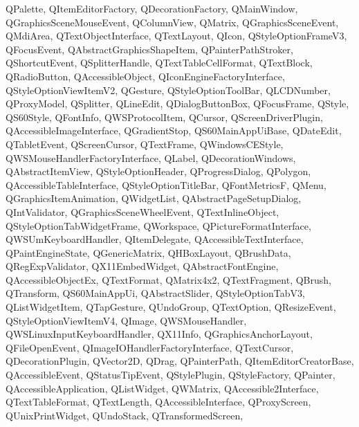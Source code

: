 {{    QPalette,%
    QItemEditorFactory,%
    QDecorationFactory,%
    QMainWindow,%
    QGraphicsSceneMouseEvent,%
    QColumnView,%
    QMatrix,%
    QGraphicsSceneEvent,%
    QMdiArea,%
    QTextObjectInterface,%
    QTextLayout,%
    QIcon,%
    QStyleOptionFrameV3,%
    QFocusEvent,%
    QAbstractGraphicsShapeItem,%
    QPainterPathStroker,%
    QShortcutEvent,%
    QSplitterHandle,%
    QTextTableCellFormat,%
    QTextBlock,%
    QRadioButton,%
    QAccessibleObject,%
    QIconEngineFactoryInterface,%
    QStyleOptionViewItemV2,%
    QGesture,%
    QStyleOptionToolBar,%
    QLCDNumber,%
    QProxyModel,%
    QSplitter,%
    QLineEdit,%
    QDialogButtonBox,%
    QFocusFrame,%
    QStyle,%
    QS60Style,%
    QFontInfo,%
    QWSProtocolItem,%
    QCursor,%
    QScreenDriverPlugin,%
    QAccessibleImageInterface,%
    QGradientStop,%
    QS60MainAppUiBase,%
    QDateEdit,%
    QTabletEvent,%
    QScreenCursor,%
    QTextFrame,%
    QWindowsCEStyle,%
    QWSMouseHandlerFactoryInterface,%
    QLabel,%
    QDecorationWindows,%
    QAbstractItemView,%
    QStyleOptionHeader,%
    QProgressDialog,%
    QPolygon,%
    QAccessibleTableInterface,%
    QStyleOptionTitleBar,%
    QFontMetricsF,%
    QMenu,%
    QGraphicsItemAnimation,%
    QWidgetList,%
    QAbstractPageSetupDialog,%
    QIntValidator,%
    QGraphicsSceneWheelEvent,%
    QTextInlineObject,%
    QStyleOptionTabWidgetFrame,%
    QWorkspace,%
    QPictureFormatInterface,%
    QWSUmKeyboardHandler,%
    QItemDelegate,%
    QAccessibleTextInterface,%
    QPaintEngineState,%
    QGenericMatrix,%
    QHBoxLayout,%
    QBrushData,%
    QRegExpValidator,%
    QX11EmbedWidget,%
    QAbstractFontEngine,%
    QAccessibleObjectEx,%
    QTextFormat,%
    QMatrix4x2,%
    QTextFragment,%
    QBrush,%
    QTransform,%
    QS60MainAppUi,%
    QAbstractSlider,%
    QStyleOptionTabV3,%
    QListWidgetItem,%
    QTapGesture,%
    QUndoGroup,%
    QTextOption,%
    QResizeEvent,%
    QStyleOptionViewItemV4,%
    QImage,%
    QWSMouseHandler,%
    QWSLinuxInputKeyboardHandler,%
    QX11Info,%
    QGraphicsAnchorLayout,%
    QFileOpenEvent,%
    QImageIOHandlerFactoryInterface,%
    QTextCursor,%
    QDecorationPlugin,%
    QVector2D,%
    QDrag,%
    QPainterPath,%
    QItemEditorCreatorBase,%
    QAccessibleEvent,%
    QStatusTipEvent,%
    QStylePlugin,%
    QStyleFactory,%
    QPainter,%
    QAccessibleApplication,%
    QListWidget,%
    QWMatrix,%
    QAccessible2Interface,%
    QTextTableFormat,%
    QTextLength,%
    QAccessibleInterface,%
    QProxyScreen,%
    QUnixPrintWidget,%
    QUndoStack,%
    QTransformedScreen,%
}}
